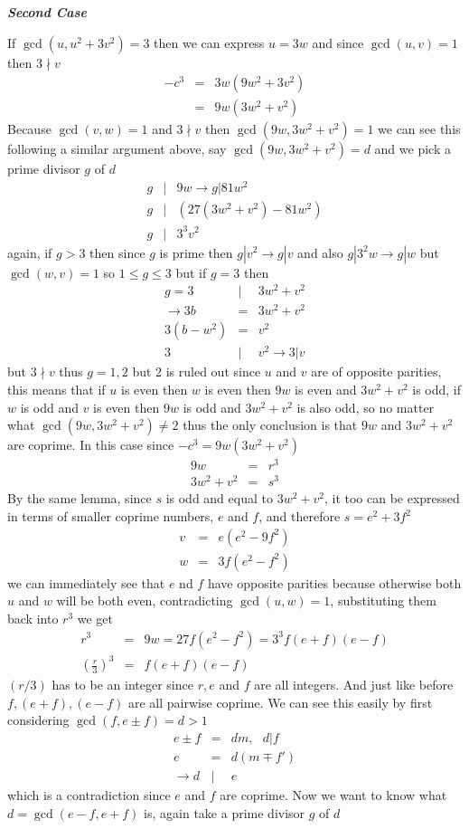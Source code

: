 \documentclass[aps,preprint,preprintnumbers,nofootinbib,showpacs,prd]{revtex4-1}
\newcommand{\nbea}{\begin{eqnarray*}}
\newcommand{\neea}{\end{eqnarray*}}
\begin{document}
\bigskip
\textit{\textbf{Second Case}}
\smallskip

If $\gcd(u, u^2 + 3v^2) = 3$ then we can express $u = 3w$ and since $\gcd(u,v)=1$ then $3 \nmid v$
%
\nbea
-c^3 & = & 3w (9w^2 + 3v^2) \\
& = & 9w (3w^2 + v^2)
\neea
%
Because $\gcd(v,w)=1$ and $3 \nmid v$ then $\gcd(9w, 3w^2 + v^2) = 1$ we can see this following a similar argument above, say $\gcd(9w, 3w^2 + v^2)=d$ and we pick a prime divisor $g$ of $d$
%
\nbea
g &|& 9w \to g|81w^2 \\
g &|& (27(3w^2 + v^2) - 81w^2) \\
g &|& 3^3v^2
\neea
%
again, if $g>3$ then since $g$ is prime then $g|v^2 \to g|v$ and also $g |3^2 w \to g |w$ but $\gcd(w,v)=1$ so $ 1 \le g \le 3$ but if $g = 3$ then
%
\nbea
g = 3 &|& 3w^2 + v^2 \\
\to 3b & = & 3w^2 + v^2 \\
3 (b - w^2) & = & v^2 \\
3 &|& v^2 \to 3 | v
\neea
%
but $3 \nmid v$ thus $g = 1,2$ but 2 is ruled out since $u$ and $v$ are of opposite parities, this means that if $u$ is even then $w$ is even then $9w$ is even and $3w^2 + v^2$ is odd, if $w$ is odd and $v$ is even then $9w$ is odd and $3w^2 + v^2$ is also odd, so no matter what $\gcd(9w,3w^2+v^2) \neq 2$ thus the only conclusion is that $9w$ and $3w^2+v^2$ are coprime. In this case since $-c^3 = 9w(3w^2 + v^2)$
%
\nbea
9w & = & r^3 \\
3w^2 + v^2 & = & s^3
\neea
%
By the same lemma, since $s$ is odd and equal to $3w^2 + v^2$, it too can be expressed in terms of smaller coprime numbers, $e$ and $f$, and therefore $s = e^2 + 3f^2$
%
\nbea
v & = & e (e^2 - 9f^2) \\
w & = & 3f (e^2 - f^2)
\neea
%
we can immediately see that $e$ nd $f$ have opposite parities because otherwise both $u$ and $w$ will be both even, contradicting $\gcd(u,w) = 1$, substituting them back into $r^3$ we get
%
\nbea
r^3 & = & 9w = 27f(e^2 - f^2) = 3^3f(e+f)(e-f) \\
\left (\frac{r}{3}\right)^3 & = & f (e+f)(e-f)
\neea
%
$(r/3)$ has to be an integer since $r, e$ and $f$ are all integers. And just like before $f, (e+f), (e-f)$ are all pairwise coprime. We can see this easily by first considering $\gcd(f, e \pm f) = d > 1$
%
\nbea
e \pm f & = & d m, ~~~ d|f \\
e & = & d (m \mp f') \\
\to d &|& e
\neea
%
which is a contradiction since $e$ and $f$ are coprime. Now we want to know what $d = \gcd(e-f, e+f)$ is, again take a prime divisor $g$ of $d$
\end{document}
